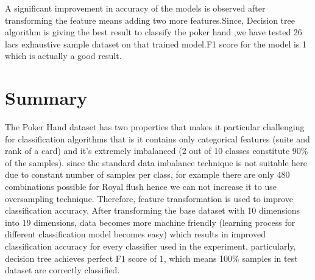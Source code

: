 \documentclass[11pt, oneside]{article}   	%
\begin{document}
\vspace{10mm}
A significant improvement in accuracy of the models is observed after transforming the feature means adding two more features.Since, Decision tree algorithm is giving the best result to classify the poker hand ,we have tested 26 lacs exhaustive sample dataset on that trained model.F1 score for the model is 1 which is actually a good result.





\section{Summary}

The Poker Hand dataset has two properties that makes it particular challenging for classification algorithms that is it contains only categorical features (suite and rank of a card) and it’s extremely imbalanced (2 out of 10 classes constitute 90\% of the samples). since the standard data imbalance technique is not suitable here due to constant number of samples per class, for example there are only 480 combinations possible for Royal flush hence we can not increase it to use oversampling technique.
Therefore, feature transformation is used to improve classification accuracy. After transforming the base dataset with 10 dimensions into 19 dimensions, data becomes more machine friendly (learning process for different classification model becomes easy) which results in improved classification accuracy for every classifier used in the experiment, particularly, decision tree achieves perfect F1 score of 1, which means 100\% samples in test dataset are correctly classified.





\nocite{*}%
	

\end{document}
